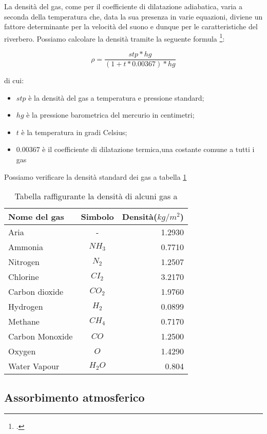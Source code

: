 La densità del gas, come per il coefficiente di dilatazione adiabatica, varia a
seconda della temperatura che, data la sua presenza in varie equazioni, diviene
un fattore determinante per la velocità del suono e dunque per le
caratteristiche del riverbero. Possiamo calcolare la densità tramite la seguente
formula \footcite{gb:book}:%

\begin{equation}
\rho = \frac{stp*hg}{(1+t*0.00367)*hg}
\end{equation}

di cui:

\begin{itemize}
  \item $stp$ è la densità del gas a temperatura e pressione standard;
  \item $hg$ è la pressione barometrica del mercurio in centimetri;
  \item $t$ è la temperatura in gradi Celsius;
  \item $0.00367$ è il coefficiente di dilatazione termica,una costante comune
        a tutti i gas
\end{itemize}

Possiamo verificare la densità standard dei gas a tabella \ref{tab:dens}

\bigskip
\begin{table}[h]
\centering
\caption{Tabella raffigurante la densità di alcuni gas a \emph{}}
\label{tab:dens}
\begin{tabular}{lcr}
\toprule
Nome del gas & Simbolo & Densità($kg/m^2$) \\
\midrule
Aria & - & 1.2930 \\
Ammonia & $NH_3$ & 0.7710 \\
Nitrogen & $N_2$ & 1.2507 \\
Chlorine & $CI_2$ & 3.2170 \\
Carbon dioxide & $CO_2$ & 1.9760 \\
Hydrogen & $H_2$ & 0.0899 \\
Methane & $CH_4$ & 0.7170 \\
Carbon Monoxide & $CO$ & 1.2500 \\
Oxygen & $O$ &1.4290 \\
Water Vapour & $H_2O$ & 0.804 \\
\bottomrule
\end{tabular}
\end{table}
\smallskip

\subsection{Assorbimento atmosferico}

